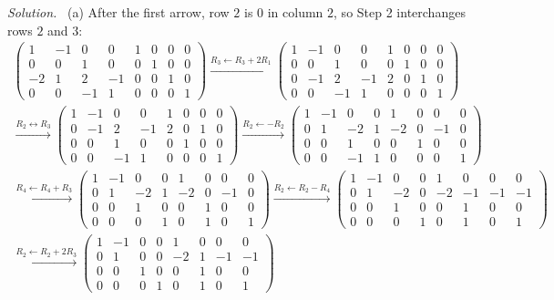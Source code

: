 \documentclass[12pt]{article}
\theoremstyle{definition}
\newenvironment{solution}{\par\noindent\textit{Solution.}\ }{\par\smallskip}
\begin{document}
\begin{solution}
(a) After the first arrow, row \(2\) is \(0\) in column \(2\), so Step 2 interchanges rows \(2\) and \(3\):
\[
\begin{gathered}
\left(\begin{array}{cccc|cccc}1&-1&0&0&1&0&0&0\\0&0&1&0&0&1&0&0\\-2&1&2&-1&0&0&1&0\\0&0&-1&1&0&0&0&1\end{array}\right)
\xrightarrow{R_3\leftarrow R_3+2R_1}
\left(\begin{array}{cccc|cccc}1&-1&0&0&1&0&0&0\\0&0&1&0&0&1&0&0\\0&-1&2&-1&2&0&1&0\\0&0&-1&1&0&0&0&1\end{array}\right)
\\
\xrightarrow{R_2\leftrightarrow R_3}
\left(\begin{array}{cccc|cccc}1&-1&0&0&1&0&0&0\\0&-1&2&-1&2&0&1&0\\0&0&1&0&0&1&0&0\\0&0&-1&1&0&0&0&1\end{array}\right)
\xrightarrow{R_2\leftarrow-R_2}
\left(\begin{array}{cccc|cccc}1&-1&0&0&1&0&0&0\\0&1&-2&1&-2&0&-1&0\\0&0&1&0&0&1&0&0\\0&0&-1&1&0&0&0&1\end{array}\right)
\\
\xrightarrow{R_4\leftarrow R_4+R_3}
\left(\begin{array}{cccc|cccc}1&-1&0&0&1&0&0&0\\0&1&-2&1&-2&0&-1&0\\0&0&1&0&0&1&0&0\\0&0&0&1&0&1&0&1\end{array}\right)
\xrightarrow{R_2\leftarrow R_2-R_4}
\left(\begin{array}{cccc|cccc}1&-1&0&0&1&0&0&0\\0&1&-2&0&-2&-1&-1&-1\\0&0&1&0&0&1&0&0\\0&0&0&1&0&1&0&1\end{array}\right)
\\
\xrightarrow{R_2\leftarrow R_2+2R_3}
\left(\begin{array}{cccc|cccc}1&-1&0&0&1&0&0&0\\0&1&0&0&-2&1&-1&-1\\0&0&1&0&0&1&0&0\\0&0&0&1&0&1&0&1\end{array}\right)

\end{gathered}\]
\end{solution}
\end{document}
